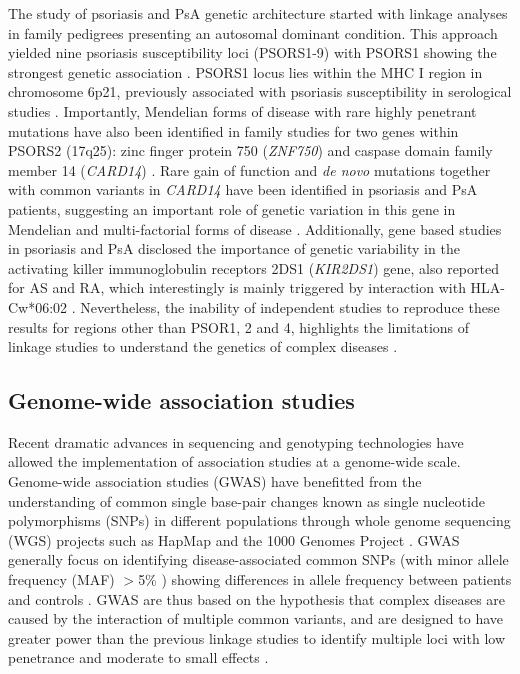 The study of psoriasis and PsA genetic architecture started with linkage analyses in family pedigrees presenting an autosomal dominant condition. This approach yielded nine psoriasis susceptibility loci (PSORS1-9) with PSORS1 showing the strongest genetic association \parencite{Capon2017, International2003}. PSORS1 locus lies within the MHC I region in chromosome 6p21, previously associated with psoriasis susceptibility in serological studies \parencite{Rusell1972, Tiilikainen1980}. Importantly, Mendelian forms of disease with rare highly penetrant mutations have also been identified in family studies for two genes within PSORS2 (17q25): zinc finger protein 750 (\textit{ZNF750}) and caspase domain family member 14 (\textit{CARD14}) \parencite{Tomfohrde1994,Jordan2012}. Rare gain of function and \textit{de novo} mutations together with common variants in \textit{CARD14} have been identified in psoriasis and PsA patients, suggesting an important role of genetic variation in this gene in Mendelian and multi-factorial forms of disease \parencite {Jordan2012, Tsoi2012}. %
 Additionally, gene based studies in psoriasis and PsA disclosed the importance of genetic variability in the activating killer immunoglobulin receptors 2DS1 (\textit{KIR2DS1}) gene, also reported for AS and RA, which interestingly is mainly triggered by interaction with HLA-Cw*06:02 \parencite{Łuszczek2004, Williams2005,Carter2007, Yen2001}.  Nevertheless, the inability of independent studies to reproduce these results for regions other than PSOR1, 2 and 4, highlights the limitations of linkage studies to understand the genetics of complex diseases \parencite{Capon2017}. 



\subsection{Genome-wide association studies}

Recent dramatic advances in sequencing and genotyping technologies have allowed the implementation of association studies at a genome-wide scale. Genome-wide association studies (GWAS) have benefitted from the understanding of common single base-pair changes known as single nucleotide polymorphisms (SNPs) in different populations through whole genome sequencing (WGS) projects such as HapMap \parencite{The international HapMaP Consortium} and the 1000 Genomes Project \parencite{The 1000 Genomes}. GWAS generally focus on identifying disease-associated common SNPs (with minor allele frequency (MAF) ${>}$5\% ) showing differences in allele frequency between patients and controls \parencite{Ku2010}. GWAS are thus based on the hypothesis that complex diseases are caused by the interaction of multiple common variants, and are designed to have greater power than the previous linkage studies to identify multiple loci with low penetrance and moderate to small effects \parencite{Schork2009, Cui2010}. 

